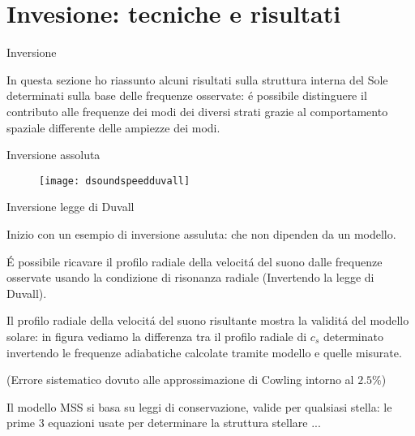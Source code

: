\documentclass[10pt,xcolor={usenames},fleqn,mathserif,serif]{beamer}
\begin{document}
\part{Invesione: tecniche e risultati}\label{part:inverseproblem}

\frame{\partpage}

\begin{wordonframe}{Inversione}

In questa sezione ho riassunto alcuni risultati sulla struttura interna del Sole determinati sulla base delle frequenze osservate:
\'e possibile distinguere il contributo alle frequenze dei modi dei diversi strati grazie al comportamento spaziale differente delle ampiezze dei modi.

\end{wordonframe}

\begin{frame}{Inversione assoluta}



\begin{figure}[!ht]
\texttt{[image: dsoundspeedduvall]} 
\end{figure}

\end{frame}

\begin{wordonframe}{Inversione legge di Duvall}

Inizio con un esempio di inversione assuluta: che non dipenden da un modello.

\'E possibile ricavare il profilo radiale della velocit\'a del suono dalle frequenze osservate usando la condizione di risonanza radiale (Invertendo la legge di Duvall).

Il profilo radiale della velocit\'a del suono risultante  mostra la validit\'a del modello solare: in figura vediamo la differenza tra il profilo radiale di $c_s$ determinato invertendo le frequenze adiabatiche calcolate tramite modello e quelle misurate.

(Errore sistematico dovuto alle approssimazione di Cowling intorno al $2.5\%$)

Il modello MSS si basa su leggi di conservazione, valide per qualsiasi stella: le prime 3 equazioni usate per determinare la struttura stellare ...

\end{wordonframe}
\end{document}
